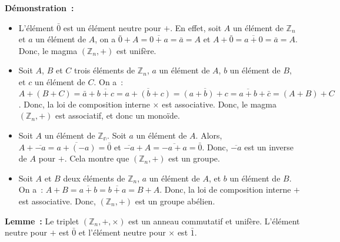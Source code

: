 \noindent\textbf{Démonstration :} 
\begin{itemize}[nosep]
    \item L'élément $\bar{0}$ est un élément neutre pour $+$.
        En effet, soit $A$ un élément de $\mathbb{Z}_n$ et $a$ un élément de $A$, on a $\bar{0} + A = \overline{0+a} = \bar{a} = A$ et $A + \bar{0} = \overline{a+0} = \bar{a} = A$.
        Donc, le magma $\left( \mathbb{Z}_n, + \right)$ est unifère.
    \item Soit $A$, $B$ et $C$ trois éléments de $\mathbb{Z}_n$, $a$ un élément de $A$, $b$ un élément de $B$, et $c$ un élément de $C$.
        On a : $A + (B + C) = \bar{a} + \overline{b+c} = \overline{a+(b+c)} = \overline{(a+b)+c} = \overline{a+b} + \bar{c} = (A + B) + C$.
        Donc, la loi de composition interne $\times$ est associative.
        Donc, le magma $\left( \mathbb{Z}_n, + \right)$ est associatif, et donc un monoïde.
    \item Soit $A$ un élément de $\mathbb{Z_n}$. 
        Soit $a$ un élément de $A$.
        Alors, $A + \overline{-a} = \overline{a+(-a)} = \bar{0}$ et $\overline{-a} + A = \overline{-a+a} = \bar{0}$.
        Donc, $\overline{-a}$ est un inverse de $A$ pour $+$.
        Cela montre que $\left( \mathbb{Z}_n, + \right)$ est un groupe.
    \item Soit $A$ et $B$ deux éléments de $\mathbb{Z}_n$, $a$ un élément de $A$, et $b$ un élément de $B$. 
        On a : $A + B = \overline{a+b} = \overline{b+a} = B + A$.
        Donc, la loi de composition interne $+$ est associative.
        Donc, $\left( \mathbb{Z}_n, + \right)$ est un groupe abélien.
\end{itemize}

\done

\medskip

\noindent\textbf{Lemme :} Le triplet $\left( \mathbb{Z}_n, +, \times \right)$ est un anneau commutatif et unifère. 
    L'élément neutre pour $+$ est $\bar{0}$ et l'élément neutre pour $\times$ est $\bar{1}$.

\medskip

